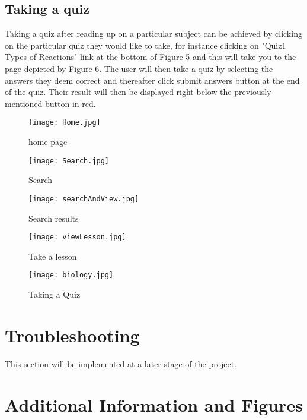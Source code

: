 \documentclass[12pt,a4paper]{article}
\begin{document}
		\subsection{Taking a quiz}
		Taking a quiz after reading up on a particular subject can be achieved by clicking on the particular quiz they would like to take, for instance clicking on "Quiz1 Types of Reactions" link at the bottom of Figure 5 and this will take you to the page depicted by Figure 6. The user will then take a quiz by selecting the answers they deem correct and thereafter click submit answers button at the end of the quiz. Their result will then be displayed right below the previously mentioned button in red.  
		 
		\pagebreak
		
		
		
		 \begin{figure}
		 	\texttt{[image: Home.jpg]}
		 	\caption{home page}
		 	\label{fig:home page}
		 \end{figure}
		 
		 \begin{figure}
		 	\texttt{[image: Search.jpg]}
		 	\caption{Search}
		 	\label{fig:Searching for subject}
		 \end{figure}
	 
	 	\begin{figure}
	 		\texttt{[image: searchAndView.jpg]}
	 		\caption{Search results}
	 		\label{fig:Searching for subject continued..}
	 	\end{figure}
 	
 		 \begin{figure}
 			\texttt{[image: viewLesson.jpg]}
 			\caption{Take a lesson}
 			\label{fig:Taking a lesson}
 		\end{figure}
 	
 		 \begin{figure}
 			\texttt{[image: biology.jpg]}
 			\caption{Taking a Quiz}
 			\label{fig:Taking a Quiz}
 		\end{figure}
 	
 	\section{Troubleshooting}
 	 This section will be implemented at a later stage of the project.
 	 
 	 
 	 	\section{Additional Information and Figures}
	
\end{document}
